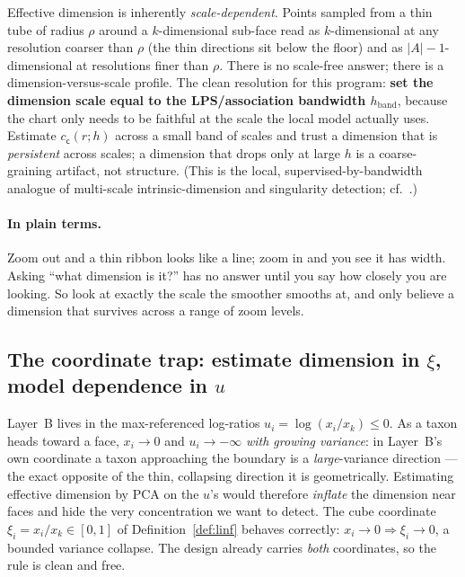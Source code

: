 \documentclass[11pt]{article}
\theoremstyle{definition}
\theoremstyle{plain}
\theoremstyle{remark}
\newcommand{\1}{\mathbf{1}}
\newcommand{\cc}{\mathsf{c}}              %
\newcommand{\abs}[1]{\lvert #1 \rvert}
\begin{document}
Effective dimension is inherently \emph{scale-dependent}. Points sampled from a
thin tube of radius $\rho$ around a $k$-dimensional sub-face read as
$k$-dimensional at any resolution coarser than $\rho$ (the thin directions sit
below the floor) and as $\abs{A}-1$-dimensional at resolutions finer than $\rho$.
There is no scale-free answer; there is a dimension-versus-scale profile. The
clean resolution for this program: \textbf{set the dimension scale equal to the
LPS/association bandwidth $h_{\mathrm{band}}$}, because the chart only needs to be
faithful at the scale the local model actually uses. Estimate $c_\cc(r;h)$ across
a small band of scales and trust a dimension that is \emph{persistent} across
scales; a dimension that drops only at large $h$ is a coarse-graining artifact,
not structure. (This is the local, supervised-by-bandwidth analogue of
multi-scale intrinsic-dimension and singularity detection;
cf.~\cite{levinabickel,stratlearn}.)

\paragraph{In plain terms.}
Zoom out and a thin ribbon looks like a line; zoom in and you see it has width.
Asking ``what dimension is it?'' has no answer until you say how closely you are
looking. So look at exactly the scale the smoother smooths at, and only believe a
dimension that survives across a range of zoom levels.

\subsection{The coordinate trap: estimate dimension in $\xi$, model dependence in
  $u$}\label{sec:trap}

Layer~B lives in the max-referenced log-ratios $u_i=\log(x_i/x_k)\le0$. As a
taxon heads toward a face, $x_i\to0$ and $u_i\to-\infty$ \emph{with growing
variance}: in Layer~B's own coordinate a taxon approaching the boundary is a
\emph{large}-variance direction --- the exact opposite of the thin, collapsing
direction it is geometrically. Estimating effective dimension by PCA on the $u$'s
would therefore \emph{inflate} the dimension near faces and hide the very
concentration we want to detect. The cube coordinate $\xi_i=x_i/x_k\in[0,1]$ of
Definition~\ref{def:linf} behaves correctly: $x_i\to0\Rightarrow\xi_i\to0$, a
bounded variance collapse. The design already carries \emph{both} coordinates,
so the rule is clean and free.
\end{document}
